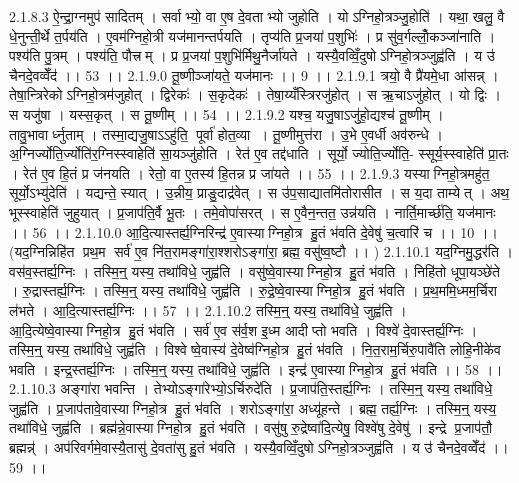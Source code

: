 2.1.8.3
ऐ॒न्द्रा॒ग्नमुप॑ सादितम् । सर्वाभ्यो॒ वा ए॒ष दे॒वताभ्यो जुहोति । योऽग्निहो॒त्रञ्जु॒होति॑ । यथा॒ खलु॒ वै धे॒नुन्ती॒र्थे त॒र्पय॑ति । ए॒वम॑ग्निहो॒त्री यज॑मानन्तर्पयति । तृप्य॑ति प्र॒जया॑ प॒शुभिः॑ । प्र सु॑व॒र्गल्लोँ॒कञ्जा॑नाति । पश्य॑ति पु॒त्रम् । पश्य॑ति॒ पौत्त्रम् । प्र प्र॒जया॑ प॒शुभि॑र्मिथु॒नैर्जा॑यते । यस्यै॒वव्विँ॒दुषोऽग्निहो॒त्रञ्जुह्व॑ति । य उ॑ चैनदे॒वव्वेँद॑ ।। 53 ।।
2.1.9.0
तू॒ष्णीञ्जा॑यते॒ यज॑मानः ।। 9 ।।
2.1.9.1
त्रयो॒ वै प्रै॑यमे॒धा आ॑सन्न् । तेषा॒न्त्रिरेकोऽग्निहो॒त्रम॑जुहोत् । द्विरेकः॑ । स॒कृदेकः॑ । तेषा॒य्यँस्त्रिरजु॑होत् । स ऋ॒चाऽजु॑होत् । यो द्विः । स यजु॑षा । यस्स॒कृत् । स तू॒ष्णीम् ।। 54 ।।
2.1.9.2
यश्च॒ यजु॒षाऽजु॑हो॒द्यश्च॑ तू॒ष्णीम् । तावु॒भावार्ध्नुताम् । तस्मा॒द्यजु॒षाऽऽहु॑ति॒ पूर्वा॑ होत॒व्या । तू॒ष्णीमुत्त॑रा । उ॒भे ए॒वर्धी अव॑रुन्धे । अ॒ग्निर्ज्योति॒र्ज्योति॑र॒ग्निस्स्वाहेति॑ सा॒यञ्जु॑होति । रेत॑ ए॒व तद्द॑धाति । सूर्यो॒ ज्योति॒र्ज्योति॒- स्सूर्य॒स्स्वाहेति॑ प्रा॒तः । रेत॑ ए॒व हि॒तं प्र ज॑नयति । रेतो॒ वा ए॒तस्य॑ हि॒तन्न प्र जा॑यते ।। 55 ।।
2.1.9.3
यस्याग्निहो॒त्रमहु॑त॒॒ सूर्यो॒ऽभ्यु॑देति॑ । यद्यन्ते॒ स्यात् । उ॒न्नीय॒ प्राङु॒दाद्र॑वेत् । स उ॑प॒साद्यातमि॑तोरासीत । स य॒दा ताम्येत् । अथ॒ भूस्स्वाहेति॑ जुहुयात् । प्र॒जाप॑ति॒र्वै भू॒तः । तमे॒वोपा॑सरत् । स ए॒वैन॒न्तत॒ उन्न॑यति । नार्ति॒मार्च्छ॑ति॒ यज॑मानः ।। 56 ।।
2.1.10.0
आ॒दि॒त्यास्तर्ह्य॒ग्निरिन्द्र॑ ए॒वास्याग्निहो॒त्र हु॒तं भ॑वति दे॒वेषु॑ च॒त्वारि॑ च ।। 10 ।। (यद॒ग्निन्निहि॑त प्रथ॒म सर्व॑ ए॒व नि॑त॒रामङ्गा॑रा॒श्शरोऽङ्गा॑रा॒ ब्रह्म॒ वसु॑ष्व॒ष्टौ ।। )
2.1.10.1
यद॒ग्निमु॒द्धर॑ति । वस॑व॒स्तर्ह्य॒ग्निः । तस्मि॒न्॒ यस्य॒ तथा॑विधे॒ जुह्व॑ति । वसु॑ष्वे॒वास्याग्निहो॒त्र हु॒तं भ॑वति । निहि॑तो धूपा॒यञ्छे॑ते । रु॒द्रास्तर्ह्य॒ग्निः । तस्मि॒न्॒ यस्य॒ तथा॑विधे॒ जुह्व॑ति । रु॒द्रे॒ष्वे॒वास्याग्निहो॒त्र हु॒तं भ॑वति । प्र॒थ॒ममि॒ध्मम॒र्चिरा ल॑भते । आ॒दि॒त्यास्तर्ह्य॒ग्निः ।। 57 ।।
2.1.10.2
तस्मि॒न्॒ यस्य॒ तथा॑विधे॒ जुह्व॑ति । आ॒दि॒त्येष्वे॒वास्याग्निहो॒त्र हु॒तं भ॑वति । सर्व॑ ए॒व स॑र्व॒श इ॒ध्म आदीप्तो भवति । विश्वे॑ दे॒वास्तर्ह्य॒ग्निः । तस्मि॒न्॒ यस्य॒ तथा॑विधे॒ जुह्व॑ति । विश्वेष्वे॒वास्य॑ दे॒वेष्व॑ग्निहो॒त्र हु॒तं भ॑वति । नि॒त॒राम॒र्चिरु॒पावै॑ति लोहि॒नीके॑व भवति । इन्द्र॒स्तर्ह्य॒ग्निः । तस्मि॒न्॒ यस्य॒ तथा॑विधे॒ जुह्व॑ति । इन्द्र॑ ए॒वास्याग्निहो॒त्र हु॒तं भ॑वति ।। 58 ।।
2.1.10.3
अङ्गा॑रा भवन्ति । तेभ्योऽङ्गा॑रेभ्यो॒ऽर्चिरुदे॑ति । प्र॒जाप॑ति॒स्तर्ह्य॒ग्निः । तस्मि॒न्॒ यस्य॒ तथा॑विधे॒ जुह्व॑ति । प्र॒जाप॑तावे॒वास्याग्निहो॒त्र हु॒तं भ॑वति । शरोऽङ्गा॑रा॒ अध्यू॑हन्ते । ब्रह्म॒ तर्ह्य॒ग्निः । तस्मि॒न्॒ यस्य॒ तथा॑विधे॒ जुह्व॑ति । ब्रह्म॑न्ने॒वास्याग्निहो॒त्र हु॒तं भ॑वति । वसु॑षु रु॒द्रेष्वा॑दि॒त्येषु॒ विश्वे॑षु दे॒वेषु॑ । इन्द्रे प्र॒जाप॑तौ॒ ब्रह्मन्न्॑ । अप॑रिवर्गमे॒वास्यै॒तासु॑ दे॒वता॑सु हु॒तं भ॑वति । यस्यै॒वव्विँ॒दुषोऽग्निहो॒त्रञ्जुह्व॑ति । य उ॑ चैनदे॒वव्वेँद॑ ।। 59 ।।
